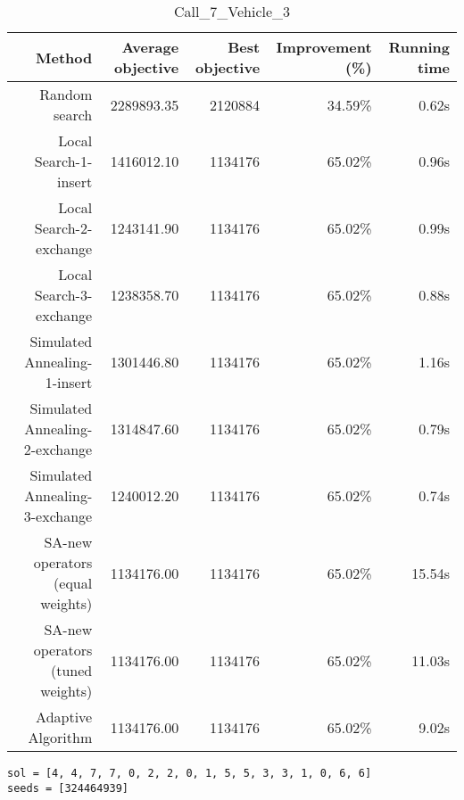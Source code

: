 \begin{table}[ht]
\centering
\caption{Call\_7\_Vehicle\_3}
\label{tab:call7vehicle3}
\begin{tabular}{|r|r|r|r|r|}
Method & Average objective & Best objective & Improvement (\%) & Running time \\
\hline
Random search & 2289893.35 & 2120884 & 34.59\% & 0.62s\\
Local Search-1-insert & 1416012.10 & 1134176 & 65.02\% & 0.96s\\
Local Search-2-exchange & 1243141.90 & 1134176 & 65.02\% & 0.99s\\
Local Search-3-exchange & 1238358.70 & 1134176 & 65.02\% & 0.88s\\
Simulated Annealing-1-insert & 1301446.80 & 1134176 & 65.02\% & 1.16s\\
Simulated Annealing-2-exchange & 1314847.60 & 1134176 & 65.02\% & 0.79s\\
Simulated Annealing-3-exchange & 1240012.20 & 1134176 & 65.02\% & 0.74s\\
SA-new operators (equal weights) & 1134176.00 & 1134176 & 65.02\% & 15.54s\\
SA-new operators (tuned weights) & 1134176.00 & 1134176 & 65.02\% & 11.03s\\
Adaptive Algorithm & 1134176.00 & 1134176 & 65.02\% & 9.02s\\
\end{tabular}%
\end{table}
\begin{lstlisting}[label={lst:call7vehicle3},caption=Optimal solution call\_7\_vehicle\_3]
sol = [4, 4, 7, 7, 0, 2, 2, 0, 1, 5, 5, 3, 3, 1, 0, 6, 6]
seeds = [324464939]
\end{lstlisting}%
\clearpage


